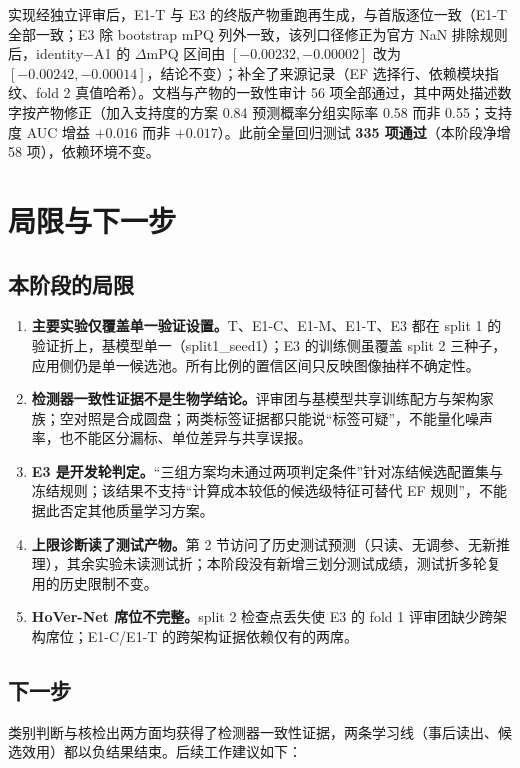 \documentclass[11pt,a4paper,UTF8,fontset=fandol]{ctexart}
\begin{document}
实现经独立评审后，E1-T 与 E3 的终版产物重跑再生成，与首版逐位一致（E1-T 全部一致；E3 除 bootstrap mPQ 列外一致，该列口径修正为官方 NaN 排除规则后，identity$-$A1 的 $\Delta$mPQ 区间由 $[-0.00232,-0.00002]$ 改为 $[-0.00242,-0.00014]$，结论不变）；补全了来源记录（EF 选择行、依赖模块指纹、fold 2 真值哈希）。文档与产物的一致性审计 56 项全部通过，其中两处描述数字按产物修正（加入支持度的方案 0.84 预测概率分组实际率 0.58 而非 0.55；支持度 AUC 增益 $+0.016$ 而非 $+0.017$）。此前全量回归测试 \textbf{335 项通过}（本阶段净增 58 项），依赖环境不变。

\section{局限与下一步}

\subsection{本阶段的局限}

\begin{enumerate}
\item \textbf{主要实验仅覆盖单一验证设置。}T、E1-C、E1-M、E1-T、E3 都在 split 1 的验证折上，基模型单一（split1\_seed1）；E3 的训练侧虽覆盖 split 2 三种子，应用侧仍是单一候选池。所有比例的置信区间只反映图像抽样不确定性。
\item \textbf{检测器一致性证据不是生物学结论。}评审团与基模型共享训练配方与架构家族；空对照是合成圆盘；两类标签证据都只能说“标签可疑”，不能量化噪声率，也不能区分漏标、单位差异与共享误报。
\item \textbf{E3 是开发轮判定。}“三组方案均未通过两项判定条件”针对冻结候选配置集与冻结规则；该结果不支持“计算成本较低的候选级特征可替代 EF 规则”，不能据此否定其他质量学习方案。
\item \textbf{上限诊断读了测试产物。}第 2 节访问了历史测试预测（只读、无调参、无新推理），其余实验未读测试折；本阶段没有新增三划分测试成绩，测试折多轮复用的历史限制不变。
\item \textbf{HoVer-Net 席位不完整。}split 2 检查点丢失使 E3 的 fold 1 评审团缺少跨架构席位；E1-C/E1-T 的跨架构证据依赖仅有的两席。
\end{enumerate}

\subsection{下一步}

类别判断与核检出两方面均获得了检测器一致性证据，两条学习线（事后读出、候选效用）都以负结果结束。后续工作建议如下：
\end{document}
